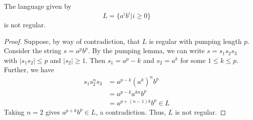 \begin{theorem}
      The language given by \[ L=\{a^i b^i|i\geq0\} \] is not regular.
\end{theorem}

\begin{proof}
      Suppose, by way of contradiction, that \(L\) is regular with pumping length \(p\). Consider the string \(s=a^p b^p\). By the pumping lemma, we can write \(s=s_1s_2s_3\) with \(|s_1s_2|\leq p\) and \(|s_2|\geq 1\). Then \(s_1=a^p-k\) and \(s_2=a^k\) for some \(1\leq k\leq p\). Further, we have 
      \begin{align*}
            s_1s_2^n s_3 &= a^{p-k}{(a^k)}^n b^p\\
                         &= a^{p-k}a^{kn}b^p\\
                         &= a^{p+(n-1)k}b^p \in L
      \end{align*}
      Taking \(n=2\) gives \(a^{p+k}b^p\in L\), a contradiction. Thus, \(L\) is not regular.
\end{proof}